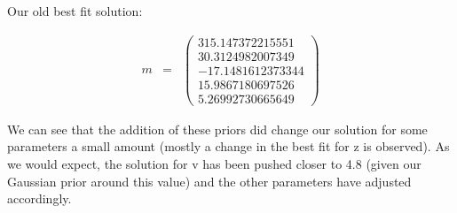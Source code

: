 \documentclass[11pt]{article}
\begin{document}
Our old best fit solution:

\begin{eqnarray*}
  m & = & 
  \left(
  \begin{array}{c}
      315.147372215551 \\
          30.3124982007349 \\
         -17.1481612373344 \\
          15.9867180697526 \\
          5.26992730665649 
  \end{array}
  \right) 
\end{eqnarray*}

We can see that the addition of these priors did change our solution for some parameters a small amount (mostly a change in the best fit for z is observed).  As we would expect, the solution for v has been pushed closer to 4.8 (given our Gaussian prior around this value) and the other parameters have adjusted accordingly.
\end{document}
